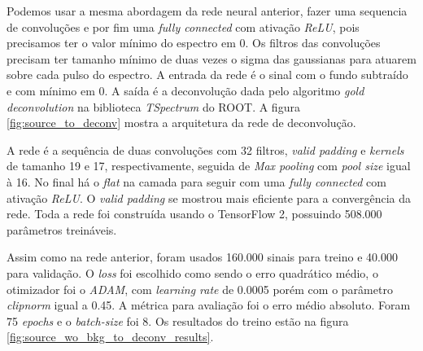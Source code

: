 \documentclass[a4paper,12pt,oneside]{book}
\begin{document}


\par Podemos usar a mesma abordagem da rede neural anterior, fazer uma sequencia de convoluções e por fim uma \textit{fully connected} com ativação \textit{ReLU}, pois precisamos ter o valor mínimo do espectro em 0. Os filtros das convoluções precisam ter tamanho mínimo de duas vezes o sigma das gaussianas para atuarem sobre cada pulso do espectro. A entrada da rede é o sinal com o fundo subtraído e com mínimo em 0. A saída é a deconvolução dada pelo algoritmo \textit{gold deconvolution} na biblioteca \textit{TSpectrum} do ROOT. A figura \ref{fig:source_to_deconv} mostra a arquitetura da rede de deconvolução.

\par A rede é a sequência de duas convoluções com 32 filtros, \textit{valid padding} e \textit{kernels} de tamanho 19 e 17, respectivamente, seguida de \textit{Max pooling} com \textit{pool size} igual à 16. No final há o \textit{flat} na camada para seguir com uma \textit{fully connected} com ativação \textit{ReLU}. O \textit{valid padding} se mostrou mais eficiente para a convergência da rede. Toda a rede foi construída usando o TensorFlow 2, possuindo 508.000 parâmetros treináveis.

\par Assim como na rede anterior, foram usados 160.000 sinais para treino e 40.000 para validação. O \textit{loss} foi escolhido como sendo o erro quadrático médio, o otimizador foi o \textit{ADAM}, com \textit{learning rate} de 0.0005 porém com o parâmetro \textit{clipnorm} igual a 0.45. A métrica para avaliação foi o erro médio absoluto. Foram 75 \textit{epochs} e o \textit{batch-size} foi 8. Os resultados do treino estão na figura \ref{fig:source_wo_bkg_to_deconv_results}.
\end{document}
